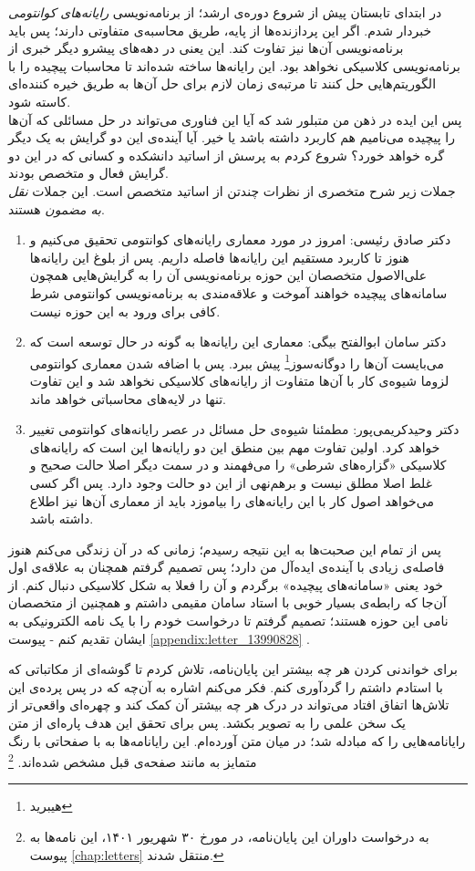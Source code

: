 در ابتدای تابستان پیش از شروع دوره‌ی ارشد؛ از برنامه‌نویسی \emph{رایانه‌های کوانتومی} خبردار شدم. اگر این پردازنده‌ها از پایه، طریق محاسبه‌ی متفاوتی دارند؛ پس باید برنامه‌نویسی آن‌ها نیز تفاوت کند. این یعنی در دهه‌های پیشرو دیگر خبری از برنامه‌نویسی کلاسیکی نخواهد بود. این رایانه‌ها ساخته شده‌اند تا محاسبات پیچیده را با الگوریتم‌هایی حل کنند تا مرتبه‌ی زمان لازم برای حل آن‌ها به طریق خیره کننده‌ای کاسته شود.\\
پس این ایده در ذهن من متبلور شد که آیا این فناوری می‌تواند در حل مسائلی که آن‌ها را پیچیده می‌نامیم هم کاربرد داشته باشد یا خیر.  آیا آینده‌ی این دو گرایش به یک دیگر گره خواهد خورد؟ شروع کردم به پرسش از اساتید دانشکده و کسانی که در این دو گرایش فعال و متخصص بودند.\\
جملات زیر شرح متخصری از نظرات چندتن از اساتید متخصص است. این جملات \emph{نقل به مضمون} هستند.
\begin{enumerate}
	\item 
	دکتر صادق رئیسی: امروز در مورد معماری رایانه‌های کوانتومی تحقیق می‌کنیم و هنوز تا کاربرد مستقیم این رایانه‌ها فاصله داریم. پس از بلوغ این رایانه‌ها علی‌الاصول متخصصان این حوزه برنامه‌نویسی آن را به گرایش‌هایی همچون سامانه‌های پیچیده خواهند آموخت و علاقه‌مندی به برنامه‌نویسی کوانتومی شرط کافی برای ورود به این حوزه نیست.
	\item
	دکتر سامان ابوالفتح بیگی: معماری این رایانه‌ها به گونه در حال توسعه است که می‌بایست آن‌ها را دوگانه‌سوز\footnote{هیبرید} پیش ببرد. پس با اضافه شدن معماری کوانتومی لزوما شیوه‌ی کار با آن‌ها متفاوت از رایانه‌های کلاسیکی نخواهد شد و این تفاوت تنها در لایه‌های محاسباتی خواهد ماند.
	\item 
	دکتر وحیدکریمی‌پور: مطمئنا شیوه‌ی حل مسائل در عصر رایانه‌های کوانتومی تغییر خواهد کرد. اولین تفاوت مهم بین منطق این دو رایانه‌ها این است که رایانه‌های کلاسیکی «گزاره‌های شرطی» را می‌فهمند و در سمت دیگر اصلا حالت صحیح و غلط اصلا مطلق نیست و برهم‌نهی از این دو حالت وجود دارد. پس اگر کسی می‌خواهد اصول کار با این رایانه‌های را بیاموزد باید از معماری آن‌ها نیز اطلاع داشته باشد.

\end{enumerate}



پس از تمام این صحبت‌ها به این نتیجه رسیدم؛ زمانی که در آن زندگی می‌کنم هنوز فاصله‌ی زیادی با آینده‌ی ایده‌آل من دارد؛ پس تصمیم گرفتم همچنان به علاقه‌ی اول خود یعنی «سامانه‌های پیچیده» برگردم و آن را فعلا به شکل کلاسیکی دنبال کنم. از آن‌جا که رابطه‌ی بسیار خوبی با استاد سامان مقیمی داشتم و همچنین از متخصصان نامی این حوزه هستند؛ تصمیم گرفتم تا درخواست خودم را با یک نامه الکترونیکی به ایشان تقدیم کنم - پیوست
\ref{appendix:letter_13990828}
.


برای خواندنی کردن هر چه بیشتر این پایان‌نامه، تلاش کردم تا گوشه‌ای از مکاتباتی که با استادم داشتم را گردآوری کنم. فکر می‌کنم اشاره به آن‌چه که  در پس پرده‌ی این تلاش‌ها اتفاق افتاد می‌تواند در درک هر چه بیشتر آن کمک کند و چهره‌ای واقعی‌تر از یک سخن علمی را به تصویر بکشد. پس برای تحقق این هدف پاره‌ای از متن رایانامه‌هایی
 را که مبادله شد؛ در میان متن آورده‌ام. این رایانامه‌ها به با صفحاتی با رنگ متمایز به مانند صفحه‌ی قبل مشخص شده‌اند.
\footnote{
به درخواست داوران این پایان‌نامه، در مورخ ۳۰ شهریور ۱۴۰۱، این نامه‌ها به پیوست 
\ref{chap:letters}
منتقل شدند.
}
